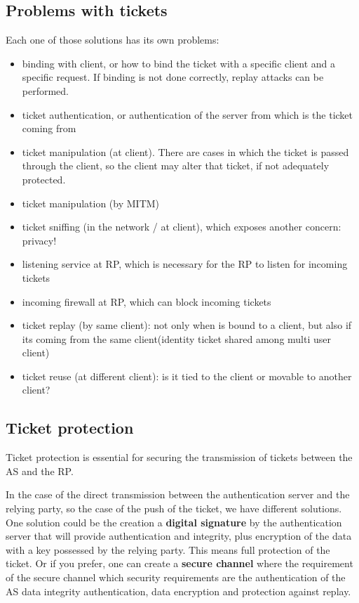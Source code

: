 \subsection{Problems with tickets}
Each one of those solutions has its own problems:
\begin{itemize}
  \item binding with client, or how to bind the ticket with a 
    specific client and a specific request. If binding is not done
    correctly, replay attacks can be performed.
  \item ticket authentication, or authentication of the server from
    which is the ticket coming from
  \item ticket manipulation (at client). There are cases in which the
    ticket is passed through the client, so the client may alter that
    ticket, if not adequately protected.
  \item ticket manipulation (by MITM)
  \item ticket sniffing (in the network / at client), which exposes
    another concern: privacy!
  \item listening service at RP, which is necessary for the RP to
    listen for incoming tickets
  \item incoming firewall at RP, which can block incoming tickets 
  \item ticket replay (by same client): not only when is bound to a
    client, but also if its coming from the same client(identity
    ticket shared among multi user client)
  \item ticket reuse (at different client): is it tied to the client
    or movable to another client?
\end{itemize}

\subsection{Ticket protection}

Ticket protection is essential for securing the transmission of
tickets between the AS and the RP. 

In the case of the direct transmission between the authentication
server and the relying party, so the case of the push of the
ticket, we have different solutions.
One solution could be the creation a \textbf{digital signature} by the
authentication server that will provide authentication and integrity,
plus encryption of the data with a key possessed by the relying party.
This means full protection of the ticket.
Or if you prefer, one can create a \textbf{secure channel} where the
requirement of the secure channel which security requirements are the
authentication of the AS data integrity authentication, data
encryption and protection against replay.

